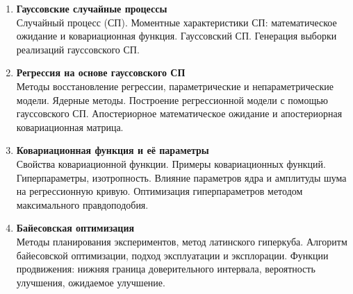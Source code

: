 \documentclass[12pt,oneside,openany]{article}
\begin{document}
\begin{enumerate}
  \item \textbf{Гауссовские случайные процессы} \\
  Случайный процесс (СП). Моментные характеристики СП: математическое ожидание и ковариационная функция.
  Гауссовский СП. Генерация выборки реализаций гауссовского СП.

  \item \textbf{Регрессия на основе гауссовского СП} \\
  Методы восстановление регрессии, параметрические и непараметрические модели. Ядерные методы. Построение регрессионной модели с помощью гауссовского СП. Апостериорное математическое ожидание и апостериорная ковариационная матрица.

  \item \textbf{Ковариационная функция и её параметры} \\
  Свойства ковариационной функции. Примеры ковариационных функций. Гиперпараметры, изотропность. Влияние параметров ядра и амплитуды шума на регрессионную кривую. Оптимизация гиперпараметров методом максимального правдоподобия.

  \item \textbf{Байесовская оптимизация} \\
  Методы планирования экспериментов, метод латинского гиперкуба.
  Алгоритм байесовской оптимизации, подход эксплуатации и эксплорации. Функции продвижения: нижняя граница доверительного интервала, вероятность улучшения, ожидаемое улучшение.

\end{enumerate}
\end{document}
